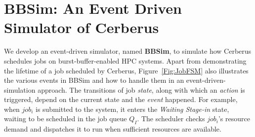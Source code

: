 

\section{BBSim: An Event Driven Simulator of Cerberus}
\label{Sec:Simulation}

We develop an event-driven simulator, named \textbf{BBSim},
to simulate how Cerberus schedules jobs on burst-buffer-enabled HPC systems.
Apart from demonstrating the lifetime of a job scheduled by Cerberus,
Figure~\ref{Fig:JobFSM} also illustrates the various events in BBSim and how to handle
them in an event-driven-simulation approach.
The transitions of job \textit{state}, along with which an \textit{action} is triggered,
depend on the current state and the \textit{event} happened.
For example, when $job_i$ is submitted to the system,
it enters the \textit{Waiting Stage-in} state,
waiting to be scheduled in the job queue $Q_I$. 
The scheduler checks $job_i$'s resource demand and
dispatches it to run when sufficient resources are available.


